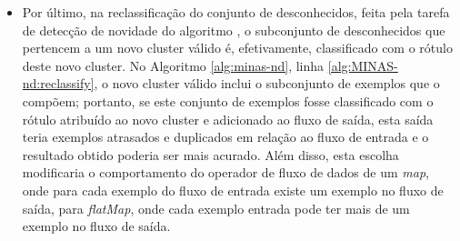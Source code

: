 \begin{itemize}
  \item Por último, na reclassificação do conjunto de desconhecidos,
  feita pela tarefa de detecção de novidade do algoritmo \minas, o subconjunto de
  desconhecidos que pertencem a um novo cluster válido é, efetivamente,
  classificado com o rótulo deste novo cluster.
  No Algoritmo \ref{alg:minas-nd}, linha \ref{alg:MINAS-nd:reclassify},
  o novo cluster válido inclui o subconjunto de exemplos que o compõem;
  portanto, se este conjunto de exemplos fosse classificado com o rótulo atribuído ao
  novo cluster e adicionado ao fluxo de saída, esta saída teria exemplos
  atrasados e duplicados em relação ao fluxo de entrada e o resultado obtido
  poderia ser mais acurado.
  Além disso, esta escolha modificaria o comportamento do operador de fluxo de
  dados de um \emph{map}, onde para cada exemplo do fluxo de entrada existe um
  exemplo no fluxo de saída, para \emph{flatMap}, onde cada exemplo entrada pode
  ter mais de um exemplo no fluxo de saída.

\end{itemize}







